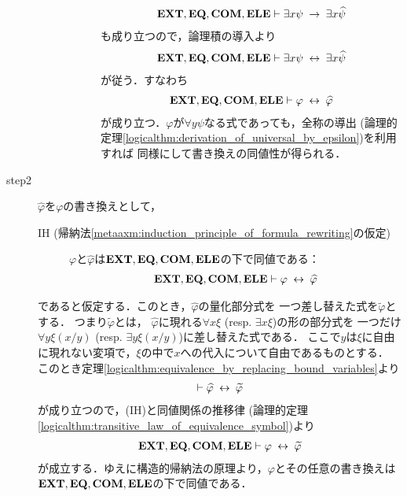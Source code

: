 \begin{sketch}
\begin{description}
\begin{description}
\begin{description}
								\begin{align}
									\mbox{{\bf EXT}},\mbox{{\bf EQ}},\mbox{\bf COM},\mbox{{\bf ELE}} \vdash \exists x \psi \hspace{0.25em}\rightarrow\hspace{0.25em} \exists x \widehat{\psi}
								\end{align}
								も成り立つので，論理積の導入より
								\begin{align}
									\mbox{{\bf EXT}},\mbox{{\bf EQ}},\mbox{\bf COM},\mbox{{\bf ELE}} \vdash \exists x \psi \hspace{0.25em}\leftrightarrow\hspace{0.25em} \exists x \widehat{\psi}
								\end{align}
								が従う．すなわち
								\begin{align}
									\mbox{{\bf EXT}},\mbox{{\bf EQ}},\mbox{\bf COM},\mbox{{\bf ELE}} \vdash \varphi \hspace{0.25em}\leftrightarrow\hspace{0.25em} \widehat{\varphi}
								\end{align}
								が成り立つ．$\varphi$が$\forall y \psi$なる式であっても，全称の導出
								(論理的定理\ref{logicalthm:derivation_of_universal_by_epsilon})を利用すれば
								同様にして書き換えの同値性が得られる．
						\end{description}
				\end{description}
				
			\item[step2] $\widehat{\varphi}$を$\varphi$の書き換えとして，
				\begin{description}
					\item[IH (帰納法\ref{metaaxm:induction_principle_of_formula_rewriting}の仮定)]
						$\varphi$と$\widehat{\varphi}$は$\mbox{{\bf EXT}},\mbox{{\bf EQ}},\mbox{\bf COM},\mbox{{\bf ELE}}$の下で同値である：
						\begin{align}
							\mbox{{\bf EXT}},\mbox{{\bf EQ}},\mbox{\bf COM},\mbox{{\bf ELE}} \vdash \varphi \hspace{0.25em}\leftrightarrow\hspace{0.25em} \widehat{\varphi}
						\end{align}
				\end{description}
				であると仮定する．このとき，$\widehat{\varphi}$の量化部分式を
				一つ差し替えた式を$\widetilde{\varphi}$とする．
				つまり$\widetilde{\varphi}$とは，
				$\widehat{\varphi}$に現れる$\forall x \xi$ (resp. $\exists x \xi$)の形の部分式を
				一つだけ$\forall y \xi(x/y)$ (resp. $\exists y \xi(x/y)$)に差し替えた式である．
				ここで$y$は$\xi$に自由に現れない変項で，$\xi$の中で$x$への代入について自由であるものとする．
				このとき定理\ref{logicalthm:equivalence_by_replacing_bound_variables}より
				\begin{align}
					\vdash \widehat{\varphi} \hspace{0.25em}\leftrightarrow\hspace{0.25em} \widetilde{\varphi}
				\end{align}
				が成り立つので，(IH)と同値関係の推移律
				(論理的定理\ref{logicalthm:transitive_law_of_equivalence_symbol})より
				\begin{align}
					\mbox{{\bf EXT}},\mbox{{\bf EQ}},\mbox{\bf COM},\mbox{{\bf ELE}} \vdash \varphi \hspace{0.25em}\leftrightarrow\hspace{0.25em} \widetilde{\varphi}
				\end{align}
				が成立する．ゆえに構造的帰納法の原理より，$\varphi$とその任意の書き換えは
				$\mbox{{\bf EXT}},\mbox{{\bf EQ}},\mbox{\bf COM},\mbox{{\bf ELE}}$の下で同値である．
				\QED
		\end{description}
	\end{sketch}
	
